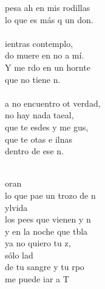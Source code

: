 \begin{cancion}
	pesa ah en mis rodillas\\
	lo que es más q un don.\\
\jump\\
	ientras  contemplo, \\
	do muere en no a mí.\\
	Y me rdo en un hornte \\
	que no tiene n. \\
\jump\\
	a no encuentro ot verdad,\\
	 no hay nada taeal,\\
	que te esdes y me gus,\\
	que te otas e ilnas\\
	dentro de ese n.\\\jump\\
	\begin{chorus}%
	oran \\
	lo que pae un trozo de n\\
	ylvida \\
	los pees que vienen y n \\
	y en la noche que tbla \\
	ya no quiero tu z, \\
	sólo lad \\
	de tu sangre y tu rpo  \\
	me puede iar a T\\
	\end{chorus}%
	\jump\\
\end{cancion}%
